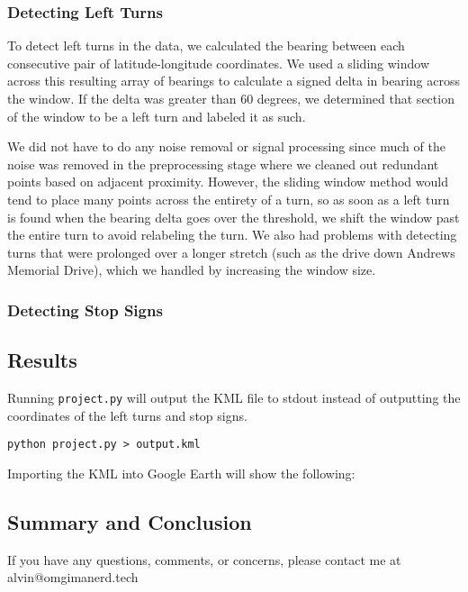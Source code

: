 \documentclass{math}
\begin{document}
\subsubsection*{Detecting Left Turns}
To detect left turns in the data, we calculated the bearing between each
consecutive pair of latitude-longitude coordinates. We used a sliding window
across this resulting array of bearings to calculate a signed delta in bearing
across the window. If the delta was greater than 60 degrees, we determined
that section of the window to be a left turn and labeled it as such. \par
We did not have to do any noise removal or signal processing since much of
the noise was removed in the preprocessing stage where we cleaned out
redundant points based on adjacent proximity. However, the sliding window
method would tend to place many points across the entirety of a turn, so
as soon as a left turn is found when the bearing delta goes over the
threshold, we shift the window past the entire turn to avoid relabeling the
turn. We also had problems with detecting turns that were prolonged over a
longer stretch (such as the drive down Andrews Memorial Drive), which we
handled by increasing the window size.

\subsubsection*{Detecting Stop Signs}

\subsection*{Results}
Running \texttt{project.py} will output the KML file to stdout instead of
outputting the coordinates of the left turns and stop signs.
\begin{lstlisting}
python project.py > output.kml
\end{lstlisting}
Importing the KML into Google Earth will show the following:

\subsection*{Summary and Conclusion}

\begin{center}
  If you have any questions, comments, or concerns, please contact me at
  alvin@omgimanerd.tech
\end{center}
\end{document}
